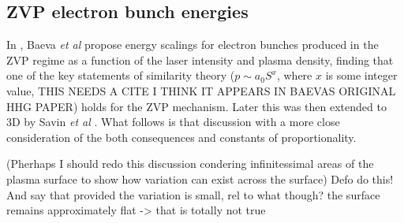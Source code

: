 \subsection{ZVP electron bunch energies}\label{sec:zvp_energies_derivation}
In \cite{baeva_2011_ZeroVectorPotential}, Baeva \textit{et al} propose energy scalings for electron bunches produced in the \ac{ZVP} regime as a function of the laser intensity and plasma density, finding that one of the key statements of similarity theory ($p \sim a_0 S^x$, where $x$ is some integer value, THIS NEEDS A CITE I THINK IT APPEARS IN BAEVAS ORIGINAL HHG PAPER) holds for the \ac{ZVP} mechanism. Later this was then extended to \ac{3D} by Savin \textit{et al} \cite{savin_2017_AttosecondscaleAbsorptionExtreme}. What follows is that discussion with a more close consideration of the both consequences and constants of proportionality.

(Pherhaps I should redo this discussion condering infinitessimal areas of the plasma surface to show how variation can exist across the surface) Defo do this! And say that provided the variation is small, rel to what though? the surface remains approximately flat -> that is totally not true

